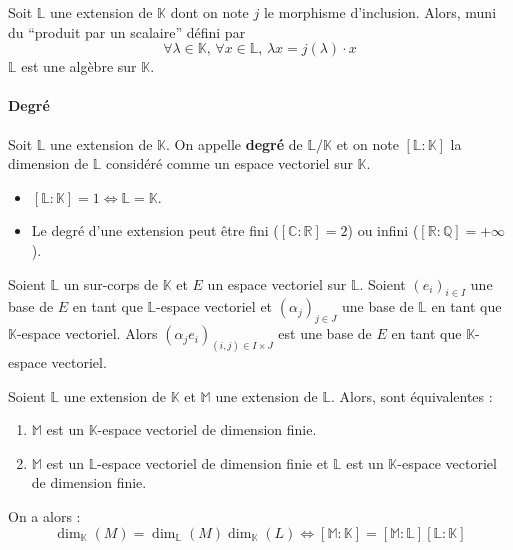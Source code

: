 	\begin{proposition}
		Soit $\mathbb{L}$ une extension de $\mathbb{K}$ dont on note $j$ le morphisme d'inclusion. Alors, muni du ``produit par un scalaire'' défini par
		\[ \forall \lambda \in \mathbb{K}, \, \forall x \in \mathbb{L}, \, \lambda x = j(\lambda) \cdot x \]
		$\mathbb{L}$ est une algèbre sur $\mathbb{K}$.
	\end{proposition}

	\paragraph{Degré}

	\begin{definition}
		Soit $\mathbb{L}$ une extension de $\mathbb{K}$. On appelle \textbf{degré} de $\mathbb{L}/\mathbb{K}$ et on note $[\mathbb{L}:\mathbb{K}]$ la dimension de $\mathbb{L}$ considéré comme un espace vectoriel sur $\mathbb{K}$.
	\end{definition}

	\begin{remark}
		\begin{itemize}
			\item $[\mathbb{L}:\mathbb{K}] = 1 \iff \mathbb{L} = \mathbb{K}$.
			\item Le degré d'une extension peut être fini ($[\mathbb{C}:\mathbb{R}] = 2$) ou infini ($[\mathbb{R}:\mathbb{Q}] = +\infty$).
		\end{itemize}
	\end{remark}

	\begin{theorem}
		Soient $\mathbb{L}$ un sur-corps de $\mathbb{K}$ et $E$ un espace vectoriel sur $\mathbb{L}$.
		Soient $(e_i)_{i \in I}$ une base de $E$ en tant que $\mathbb{L}$-espace vectoriel et $(\alpha_j)_{j \in J}$ une base de $\mathbb{L}$ en tant que $\mathbb{K}$-espace vectoriel.
		\newpar
		Alors $(\alpha_j e_i)_{(i,j) \in I \times J}$ est une base de $E$ en tant que $\mathbb{K}$-espace vectoriel.
	\end{theorem}

	\begin{corollary}
		Soient $\mathbb{L}$ une extension de $\mathbb{K}$ et $\mathbb{M}$ une extension de $\mathbb{L}$. Alors, sont équivalentes :
		\begin{enumerate}[label=(\roman*)]
			\item $\mathbb{M}$ est un $\mathbb{K}$-espace vectoriel de dimension finie.
			\item $\mathbb{M}$ est un $\mathbb{L}$-espace vectoriel de dimension finie et $\mathbb{L}$ est un $\mathbb{K}$-espace vectoriel de dimension finie.
		\end{enumerate}
		On a alors :
		\[ \dim_{\mathbb{K}}(M) = \dim_{\mathbb{L}}(M) \dim_{\mathbb{K}}(L) \iff [\mathbb{M}:\mathbb{K}] = [\mathbb{M}:\mathbb{L}] [\mathbb{L}:\mathbb{K}] \]
	\end{corollary}

